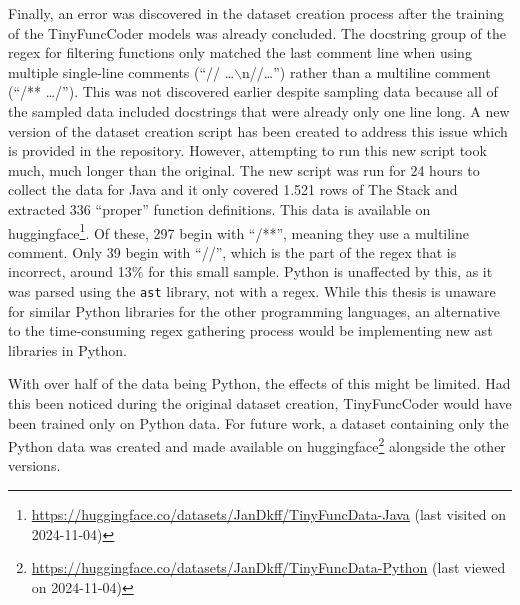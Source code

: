 Finally, an error was discovered in the dataset creation process after the training of the TinyFuncCoder models was already concluded.
The docstring group of the \ac{regex} for filtering functions only matched the last comment line when using multiple single-line comments (\enquote{// \dots$\backslash$n//\dots}) rather than a multiline comment (\enquote{/** \dots */}).
This was not discovered earlier despite sampling data because all of the sampled data included docstrings that were already only one line long.
A new version of the dataset creation script has been created to address this issue which is provided in the repository.
However, attempting to run this new script took much, much longer than the original.
The new script was run for 24 hours to collect the data for Java and it only covered 1.521 rows of The Stack and extracted 336 \enquote{proper} function definitions.
This data is available on huggingface\footnote{\url{https://huggingface.co/datasets/JanDkff/TinyFuncData-Java} (last visited on 2024-11-04)}.
Of these, 297 begin with \enquote{/**}, meaning they use a multiline comment.
Only 39 begin with \enquote{//}, which is the part of the \ac{regex} that is incorrect, around 13\% for this small sample.
Python is unaffected by this, as it was parsed using the \texttt{ast} library, not with a \ac{regex}.
While this thesis is unaware for similar Python libraries for the other programming languages, an alternative to the time-consuming \ac{regex} gathering process would be implementing new \ac{ast} libraries in Python.

With over half of the data being Python, the effects of this might be limited.
Had this been noticed during the original dataset creation, TinyFuncCoder would have been trained only on Python data.
For future work, a dataset containing only the Python data was created and made available on huggingface\footnote{\url{https://huggingface.co/datasets/JanDkff/TinyFuncData-Python} (last viewed on 2024-11-04)} alongside the other versions.


